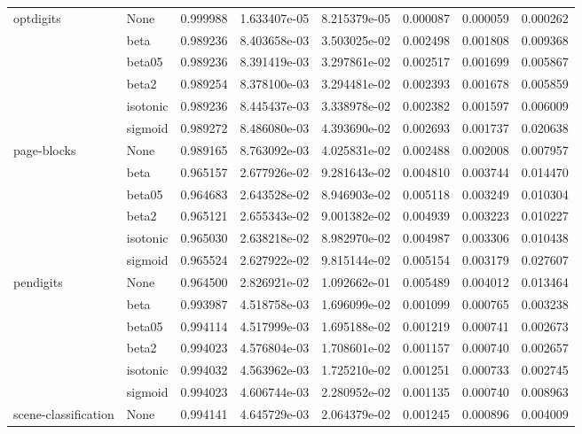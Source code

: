 \begin{tabular}{llrrrrrr}
optdigits & None &  0.999988 &  1.633407e-05 &  8.215379e-05 &  0.000087 &  0.000059 &  0.000262 \\
        & beta &  0.989236 &  8.403658e-03 &  3.503025e-02 &  0.002498 &  0.001808 &  0.009368 \\
        & beta05 &  0.989236 &  8.391419e-03 &  3.297861e-02 &  0.002517 &  0.001699 &  0.005867 \\
        & beta2 &  0.989254 &  8.378100e-03 &  3.294481e-02 &  0.002393 &  0.001678 &  0.005859 \\
        & isotonic &  0.989236 &  8.445437e-03 &  3.338978e-02 &  0.002382 &  0.001597 &  0.006009 \\
        & sigmoid &  0.989272 &  8.486080e-03 &  4.393690e-02 &  0.002693 &  0.001737 &  0.020638 \\
page-blocks & None &  0.989165 &  8.763092e-03 &  4.025831e-02 &  0.002488 &  0.002008 &  0.007957 \\
        & beta &  0.965157 &  2.677926e-02 &  9.281643e-02 &  0.004810 &  0.003744 &  0.014470 \\
        & beta05 &  0.964683 &  2.643528e-02 &  8.946903e-02 &  0.005118 &  0.003249 &  0.010304 \\
        & beta2 &  0.965121 &  2.655343e-02 &  9.001382e-02 &  0.004939 &  0.003223 &  0.010227 \\
        & isotonic &  0.965030 &  2.638218e-02 &  8.982970e-02 &  0.004987 &  0.003306 &  0.010438 \\
        & sigmoid &  0.965524 &  2.627922e-02 &  9.815144e-02 &  0.005154 &  0.003179 &  0.027607 \\
pendigits & None &  0.964500 &  2.826921e-02 &  1.092662e-01 &  0.005489 &  0.004012 &  0.013464 \\
        & beta &  0.993987 &  4.518758e-03 &  1.696099e-02 &  0.001099 &  0.000765 &  0.003238 \\
        & beta05 &  0.994114 &  4.517999e-03 &  1.695188e-02 &  0.001219 &  0.000741 &  0.002673 \\
        & beta2 &  0.994023 &  4.576804e-03 &  1.708601e-02 &  0.001157 &  0.000740 &  0.002657 \\
        & isotonic &  0.994032 &  4.563962e-03 &  1.725210e-02 &  0.001251 &  0.000733 &  0.002745 \\
        & sigmoid &  0.994023 &  4.606744e-03 &  2.280952e-02 &  0.001135 &  0.000740 &  0.008963 \\
scene-classification & None &  0.994141 &  4.645729e-03 &  2.064379e-02 &  0.001245 &  0.000896 &  0.004009 \\

\end{tabular}
